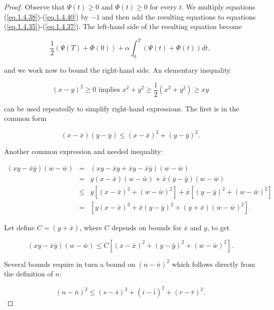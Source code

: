 \begin{proof}
Observe that $\Psi(t)\geq 0$ and $\Phi(t)\geq 0$ for every $t$. We multiply 
equations (\ref{eq.1.4.38})-(\ref{eq.1.4.40}) by $-1$ and then add the 
resulting equations to equations (\ref{eq.1.4.35})-(\ref{eq.1.4.37}). The 
left-hand side of the resulting equation become

\begin{equation*}
	\frac{1}{2}(\Psi(T)+\Phi(0))+\alpha\int_{0}^{T}(\Psi(t)+\Phi(t))dt,
\end{equation*}

and we work now to bound the right-hand side. An elementary inequality

\begin{equation*}
(x-y)^2\geq 0\,\,\mbox{implies}\,\, x^2+y^2\geq \frac{1}{2}(x^2+y^2)\geq xy
\end{equation*}

can be used repeatedly to simplify right-hand expressions. The first is in the 
common form

\begin{equation}\label{eq.1.4.41}
(x-\bar{x})(y-\bar{y})\leq (x-\bar{x})^2+(y-\bar{y})^2.
\end{equation}

Another common expression and needed inequality:

\begin{eqnarray*}
(xy-\bar{x}\bar{y})(w-\bar{w})&=& 
(xy-\bar{x}y+\bar{x}y-\bar{x}\bar{y})(w-\bar{w})\\
&=& y(x-\bar{x})(w-\bar{w})+\bar{x}(y-\bar{y})(w-\bar{w})\\
&\leq&y[(x-\bar{x})^2+(w-\bar{w})^2]+\bar{x}[(y-\bar{y})^2+(w-\bar{w})^2]\\
&=& [y(x-\bar{x})^2+\bar{x}(y-\bar{y})^2+(y+\bar{x})(w-\bar{w})^2].
\end{eqnarray*}

Let define $C=(y+\bar{x})$, where $C$ depends on bounds for $\bar{x}$ and $y$, 
to get

\begin{equation}\label{eq.1.4.42}
(xy-\bar{x}\bar{y})(w-\bar{w})\leq C[(x-\bar{x})^2+(y-\bar{y})^2+(w-\bar{w})^2].
\end{equation}

Several bounds require in turn a bound on $(n-\bar{n})^2$ which follows 
directly from the definition of $n$:

\begin{equation}\label{eq.1.4.43}
(n-\bar{n})^2\leq (s-\bar{s})^2+(i-\bar{i})^2+(r-\bar{r})^2.
\end{equation}


\end{proof}
